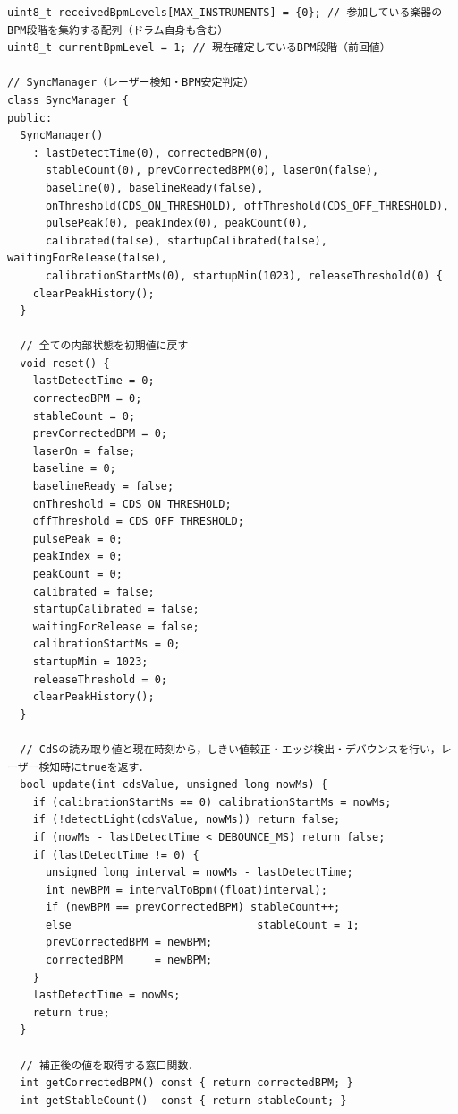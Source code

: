 \begin{lstlisting}[caption={drum\_0706.ino（楽譜データは冒頭2小節のみ掲載）}, label={lst:douki_drum_full}]
uint8_t receivedBpmLevels[MAX_INSTRUMENTS] = {0}; // 参加している楽器のBPM段階を集約する配列（ドラム自身も含む）
uint8_t currentBpmLevel = 1; // 現在確定しているBPM段階（前回値）

// SyncManager（レーザー検知・BPM安定判定）
class SyncManager {
public:
  SyncManager()
    : lastDetectTime(0), correctedBPM(0),
      stableCount(0), prevCorrectedBPM(0), laserOn(false),
      baseline(0), baselineReady(false),
      onThreshold(CDS_ON_THRESHOLD), offThreshold(CDS_OFF_THRESHOLD),
      pulsePeak(0), peakIndex(0), peakCount(0),
      calibrated(false), startupCalibrated(false), waitingForRelease(false),
      calibrationStartMs(0), startupMin(1023), releaseThreshold(0) {
    clearPeakHistory();
  }

  // 全ての内部状態を初期値に戻す
  void reset() {
    lastDetectTime = 0;
    correctedBPM = 0;
    stableCount = 0;
    prevCorrectedBPM = 0;
    laserOn = false;
    baseline = 0;
    baselineReady = false;
    onThreshold = CDS_ON_THRESHOLD;
    offThreshold = CDS_OFF_THRESHOLD;
    pulsePeak = 0;
    peakIndex = 0;
    peakCount = 0;
    calibrated = false;
    startupCalibrated = false;
    waitingForRelease = false;
    calibrationStartMs = 0;
    startupMin = 1023;
    releaseThreshold = 0;
    clearPeakHistory();
  }

  // CdSの読み取り値と現在時刻から，しきい値較正・エッジ検出・デバウンスを行い，レーザー検知時にtrueを返す．
  bool update(int cdsValue, unsigned long nowMs) {
    if (calibrationStartMs == 0) calibrationStartMs = nowMs;
    if (!detectLight(cdsValue, nowMs)) return false;
    if (nowMs - lastDetectTime < DEBOUNCE_MS) return false;
    if (lastDetectTime != 0) {
      unsigned long interval = nowMs - lastDetectTime;
      int newBPM = intervalToBpm((float)interval);
      if (newBPM == prevCorrectedBPM) stableCount++;
      else                             stableCount = 1;
      prevCorrectedBPM = newBPM;
      correctedBPM     = newBPM;
    }
    lastDetectTime = nowMs;
    return true;
  }

  // 補正後の値を取得する窓口関数．
  int getCorrectedBPM() const { return correctedBPM; }
  int getStableCount()  const { return stableCount; }


\end{lstlisting}
